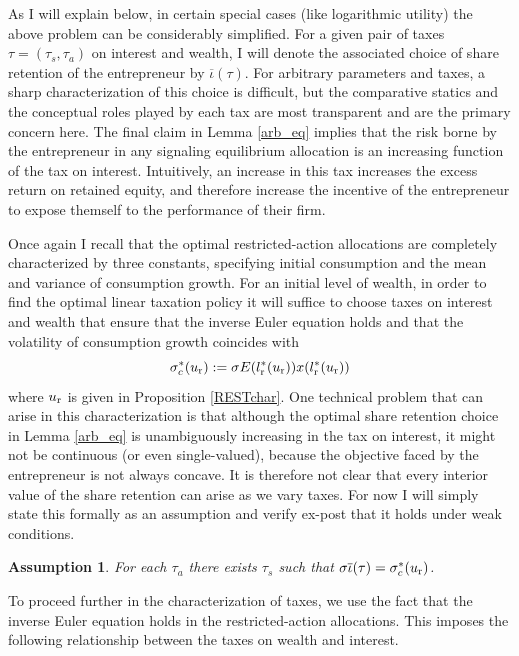 \documentclass[11pt]{article}
\theoremstyle{plain}
\newtheorem{assump}{Assumption}[section]
\begin{document}
As I will explain below, in certain special cases (like logarithmic utility) the above problem can be considerably simplified. For a given pair of taxes $\tau = (\tau_s, \tau_a)$ on interest and wealth, I will denote the associated choice of share retention of the entrepreneur by $\overline{\iota}(\tau)$. For arbitrary parameters and taxes, a sharp characterization of this choice is difficult, but the comparative statics and the conceptual roles played by each tax are most transparent and are the primary concern here. The final claim in Lemma \ref{arb_eq} implies that the risk borne by the entrepreneur in any signaling equilibrium allocation is an increasing function of the tax on interest. Intuitively, an increase in this tax increases the excess return on retained equity, and therefore increase the incentive of the entrepreneur to expose themself to the performance of their firm. 

Once again I recall that the optimal restricted-action allocations are completely characterized by three constants, specifying initial consumption and the mean and variance of consumption growth. For an initial level of wealth, in order to find the optimal linear taxation policy it will suffice to choose taxes on interest and wealth that ensure that the inverse Euler equation holds and that the volatility of consumption growth coincides with 
\begin{equation}
\sigma_c^*(u_{\textnormal{r}}) := \sigma E(l_{\textnormal{r}}^*(u_{\textnormal{r}}))x(l_{\textnormal{r}}^*(u_{\textnormal{r}}))
\label{sig_c}
\end{equation}
where $u_{\textnormal{r}}$ is given in Proposition \ref{RESTchar}. One technical problem that can arise in this characterization is that although the optimal share retention choice in Lemma \ref{arb_eq} is unambiguously increasing in the tax on interest, it might not be continuous (or even single-valued), because the objective faced by the entrepreneur is not always concave. It is therefore not clear that every interior value of the share retention can arise as we vary taxes. For now I will simply state this formally as an assumption and verify ex-post that it holds under weak conditions.

\begin{assump} \label{imp_assump}
For each $\tau_a$ there exists $\tau_s$ such that $\sigma \overline{\iota}(\tau) = \sigma_c^*(u_{\textnormal{r}})$. 
\end{assump}

To proceed further in the characterization of taxes, we use the fact that the inverse Euler equation holds in the restricted-action allocations. This imposes the following relationship between the taxes on wealth and interest. 
\end{document}
